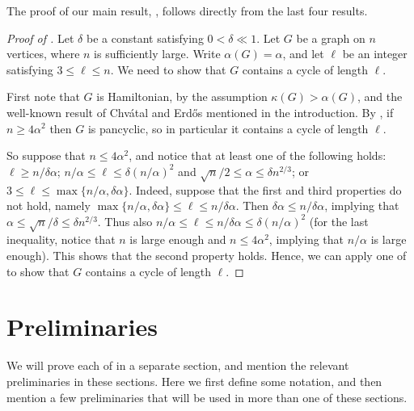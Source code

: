 \documentclass[11pt,english]{article}
\theoremstyle{plain}
\theoremstyle{definition}
\theoremstyle{remark}
\begin{document}
	The proof of our main result, , follows directly from the last four results. 

	\begin{proof}[Proof of ]
		Let $\delta$ be a constant satisfying $0 < \delta \ll 1$.
		Let $G$ be a graph on $n$ vertices, where $n$ is sufficiently large.
		Write $\alpha(G) = \alpha$, and let $\ell$ be an integer satisfying $3 \le \ell \le n$. We need to show that $G$ contains a cycle of length $\ell$.

		First note that $G$ is Hamiltonian, by the assumption $\kappa(G) > \alpha(G)$, and the well-known result of Chv\'atal and Erd\H{o}s \cite{chvatal1972note} mentioned in the introduction.
		By , if $n \ge 4\alpha^2$ then $G$ is pancyclic, so in particular it contains a cycle of length $\ell$.

		So suppose that $n \le 4\alpha^2$, and notice that at least one of the following holds: $\ell \ge n/\delta \alpha$; $n/\alpha \le \ell \le \delta(n/\alpha)^2$ and $\sqrt{n}/2 \le \alpha \le \delta n^{2/3}$; or $3 \le \ell \le \max\{n/\alpha, \delta \alpha\}$. 
		Indeed, suppose that the first and third properties do not hold, namely $\max\{n/\alpha, \delta \alpha\} \le \ell \le n/\delta \alpha$. Then $\delta \alpha \le n/\delta \alpha$, implying that $\alpha \le \sqrt{n}/\delta \le \delta n^{2/3}$. Thus also $n/\alpha \le \ell \le n/\delta \alpha \le \delta(n/\alpha)^2$ (for the last inequality, notice that $n$ is large enough and $n \le 4\alpha^2$, implying that $n/\alpha$ is large enough). This shows that the second property holds. Hence, we can apply one of  to show that $G$ contains a cycle of length $\ell$.
	\end{proof}

\section{Preliminaries} \label{sec:prelims}

	We will prove each of  in a separate section, and mention the relevant preliminaries in these sections. Here we first define some notation, and then mention a few preliminaries that will be used in more than one of these sections.
\end{document}
